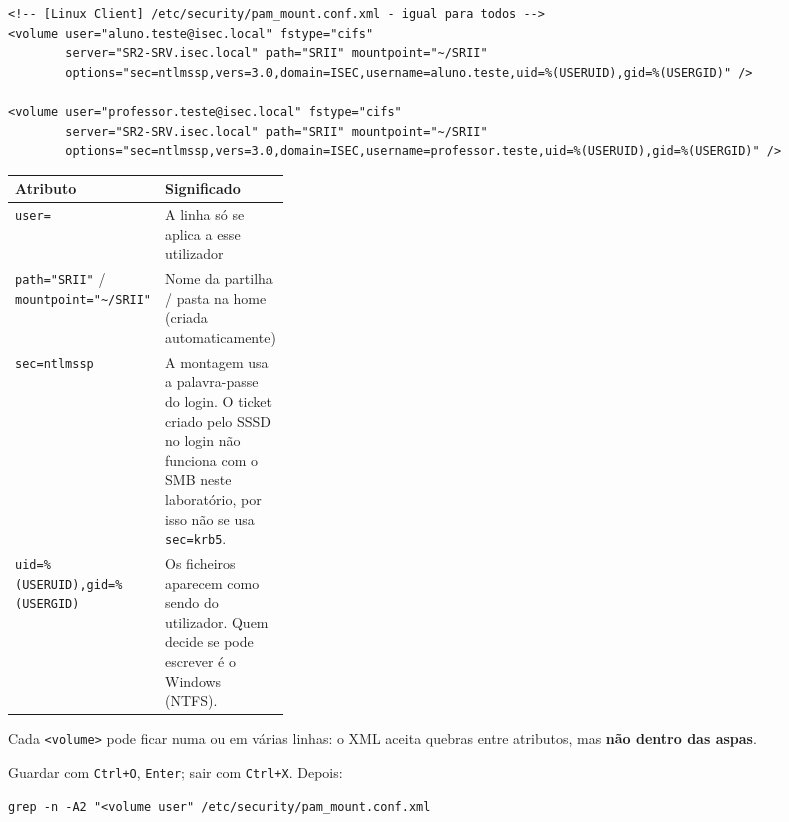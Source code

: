\begin{lstlisting}[style=cfgstyle]
<!-- [Linux Client] /etc/security/pam_mount.conf.xml - igual para todos -->
<volume user="aluno.teste@isec.local" fstype="cifs"
        server="SR2-SRV.isec.local" path="SRII" mountpoint="~/SRII"
        options="sec=ntlmssp,vers=3.0,domain=ISEC,username=aluno.teste,uid=%(USERUID),gid=%(USERGID)" />

<volume user="professor.teste@isec.local" fstype="cifs"
        server="SR2-SRV.isec.local" path="SRII" mountpoint="~/SRII"
        options="sec=ntlmssp,vers=3.0,domain=ISEC,username=professor.teste,uid=%(USERUID),gid=%(USERGID)" />
\end{lstlisting}

\begin{center}\small
\begin{tabularx}{\linewidth}{|>{\raggedright\arraybackslash}p{0.32\linewidth}|>{\raggedright\arraybackslash}X|}
\hline
\rowcolor{azul!10}\textbf{Atributo} & \textbf{Significado} \\
\hline
\texttt{user=} & A linha só se aplica a esse utilizador \\
\hline
\texttt{path="SRII"} / \texttt{mountpoint="\textasciitilde{}/\allowbreak{}SRII"} & Nome da partilha / pasta na home (criada automaticamente) \\
\hline
\texttt{sec=ntlmssp} & A montagem usa a palavra-passe do login. O ticket criado pelo SSSD no login não funciona com o SMB neste laboratório, por isso não se usa \texttt{sec=krb5}. \\
\hline
\texttt{uid=\%(USERUID),\allowbreak{}gid=\%(USERGID)} & Os ficheiros aparecem como sendo do utilizador. Quem decide se pode escrever é o Windows (NTFS). \\
\hline
\end{tabularx}
\end{center}

\begin{simplesbox}
Cada \texttt{\textless{}volume\textgreater{}} pode ficar numa ou em várias linhas: o XML aceita quebras entre atributos, mas \textbf{não dentro das aspas}.
\end{simplesbox}


Guardar com \texttt{Ctrl+O}, \texttt{Enter}; sair com \texttt{Ctrl+X}. Depois:

\begin{lstlisting}[style=bashstyle]
grep -n -A2 "<volume user" /etc/security/pam_mount.conf.xml
\end{lstlisting}

